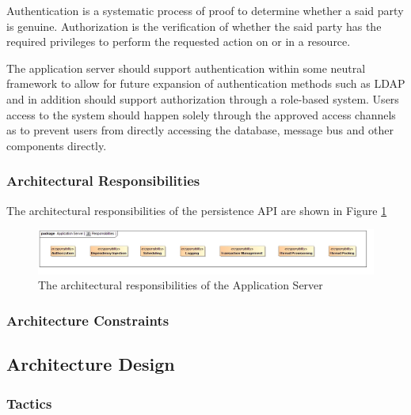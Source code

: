 Authentication is a systematic process of proof to determine whether a said
party is genuine.  Authorization is the verification of whether the said party
has the required privileges to perform the requested action on or in a resource.

The application server should support authentication within some neutral framework
to allow for future expansion of authentication methods such as LDAP and in addition
should support authorization through a role-based system. Users access to the
system should happen solely through the approved access channels as to prevent users
from directly accessing the database, message bus and other components directly.


\subsubsection{Architectural Responsibilities}
The architectural responsibilities of the persistence API are shown in
Figure \ref{fig:applicationServerResponsibilities}
\begin{figure}[H]
	\begin{center}
	\includegraphics[scale=0.4]{../Diagrams and Charts/Application Server/Responsibilities.jpg}
	\caption{The architectural responsibilities of the Application Server}
	\label{fig:applicationServerResponsibilities}
	\end{center}
\end{figure}

\subsubsection{Architecture Constraints}
\subsection{Architecture Design}
\subsubsection{Tactics}
